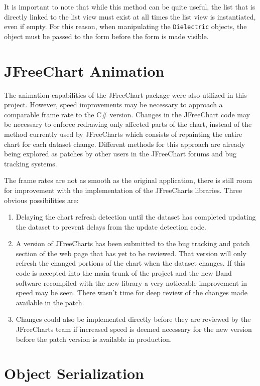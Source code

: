 \documentclass[project]{bsu-ms}
\begin{document}
It is important to note that while this method can be quite useful, the list that is directly linked to the list view must exist at all times the list view is instantiated, even if empty. For this reason, when manipulating the \texttt{Dielectric} objects, the object must be passed to the form before the form is made visible.



\section{JFreeChart Animation}\label{sec:jfreechartAnimation}
The animation capabilities of the JFreeChart package were also utilized in this project. However, speed improvements may be necessary to approach a comparable frame rate to the C\# version. Changes in the JFreeChart code may be necessary to enforce redrawing only affected parts of the chart, instead of the method currently used by JFreeCharts which consists of repainting the entire chart for each dataset change. Different methods for this approach are already being explored as patches by other users in the JFreeChart forums and bug tracking systems.

The frame rates are not as smooth as the original application, there is still room for improvement with the implementation of the JFreeCharts libraries. Three obvious possibilities are: 

\begin{enumerate}
\item Delaying the chart refresh detection until the dataset has completed updating the dataset to prevent delays from the update detection code.
\item A version of JFreeCharts has been submitted to the bug tracking and patch section of the web page that has yet to be reviewed. That version will only refresh the changed portions of the chart when the dataset changes. If this code is accepted into the main trunk of the project and the new Band software recompiled with the new library a very noticeable improvement in speed may be seen. There wasn't time for deep review of the changes made available in the patch.
\item Changes could also be implemented directly before they are reviewed by the JFreeCharts team if increased speed is deemed necessary for the new version before the patch version is available in production.
\end{enumerate}

\section{Object Serialization}\label{sec:objectSerialization}
\end{document}
